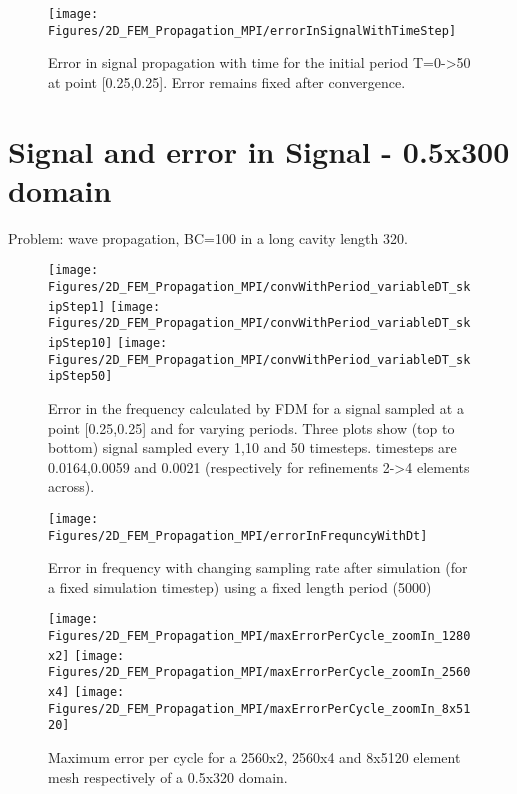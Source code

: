 \begin{figure}
  \begin{centering}
\texttt{[image: Figures/2D\_FEM\_Propagation\_MPI/errorInSignalWithTimeStep]}
\caption{Error in signal propagation with time for the initial period T=0->50 at point [0.25,0.25]. Error remains fixed after convergence.}
\end{centering}
\end{figure}

\section{Signal and error in Signal - 0.5x300 domain}

Problem: wave propagation, BC=100 in a long cavity length 320.

\begin{figure}
  \begin{centering}
\texttt{[image: Figures/2D\_FEM\_Propagation\_MPI/convWithPeriod\_variableDT\_skipStep1]}
\texttt{[image: Figures/2D\_FEM\_Propagation\_MPI/convWithPeriod\_variableDT\_skipStep10]}
\texttt{[image: Figures/2D\_FEM\_Propagation\_MPI/convWithPeriod\_variableDT\_skipStep50]}
\caption{Error in the frequency calculated by FDM for a signal sampled at a point [0.25,0.25] and for varying periods. Three plots show (top to bottom) signal sampled every 1,10 and 50 timesteps. timesteps are
0.0164,0.0059 and 0.0021 (respectively for refinements 2->4 elements across).
}
\end{centering}
\end{figure}

\begin{figure}
\texttt{[image: Figures/2D\_FEM\_Propagation\_MPI/errorInFrequncyWithDt]}
\caption{Error in frequency with changing sampling rate after simulation (for a fixed simulation timestep) using a fixed length period (5000)}
\end{figure}

\begin{figure}
    \begin{centering}
\texttt{[image: Figures/2D\_FEM\_Propagation\_MPI/maxErrorPerCycle\_zoomIn\_1280x2]}
\texttt{[image: Figures/2D\_FEM\_Propagation\_MPI/maxErrorPerCycle\_zoomIn\_2560x4]}
\texttt{[image: Figures/2D\_FEM\_Propagation\_MPI/maxErrorPerCycle\_zoomIn\_8x5120]}
\caption{Maximum error per cycle for a 2560x2, 2560x4 and 8x5120 element mesh respectively of a 0.5x320 domain.}
\end{centering}
\end{figure}

